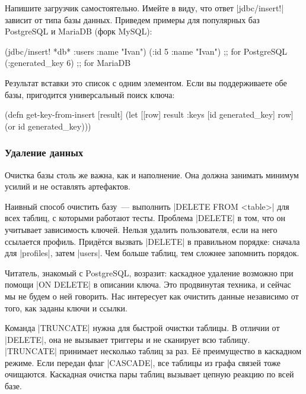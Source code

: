 
Напишите загрузчик самостоятельно. Имейте в виду, что ответ
\spverb|jdbc/insert!| зависит от типа базы данных. Приведем примеры для
популярных баз PostgreSQL и MariaDB (форк MySQL):

\begin{english}
  \begin{clojure}
(jdbc/insert! *db* :users {:name "Ivan"})
({:id 5 :name "Ivan"}) ;; for PostgreSQL
({:generated_key 6})  ;; for MariaDB
  \end{clojure}
\end{english}

Результат вставки это список с одним элементом. Если вы поддерживаете обе базы,
пригодится универсальный поиск ключа:

\begin{english}
  \begin{clojure}
(defn get-key-from-insert [result]
  (let [[row] result
        {:keys [id generated_key]} row]
    (or id generated_key)))
  \end{clojure}
\end{english}

\subsubsection*{Удаление данных}


Очистка базы столь же важна, как и наполнение. Она должна занимать минимум
усилий и не оставлять артефактов.

Наивный способ очистить базу~--- выполнить \spverb|DELETE FROM <table>| для всех
таблиц, с которыми работают тесты. Проблема \spverb|DELETE| в том, что он
учитывает зависимость ключей. Нельзя удалить пользователя, если на него
ссылается профиль. Придётся вызвать \spverb|DELETE| в правильном порядке:
сначала для \spverb|profiles|, затем \spverb|users|. Чем больше таблиц, тем
сложнее запомнить порядок.


Читатель, знакомый с PostgreSQL, возразит: каскадное удаление возможно при
помощи \spverb|ON DELETE| в описании ключа. Это продвинутая техника, и сейчас
мы не будем о ней говорить. Нас интересует как очистить данные независимо от
того, как заданы ключи и ссылки.


Команда \spverb|TRUNCATE|  нужна для быстрой очистки таблицы. В
отличии от \spverb|DELETE|, она не вызывает триггеры и не сканирует всю
таблицу. \spverb|TRUNCATE| принимает несколько таблиц за раз. Её
преимущество в каскадном режиме. Если передан флаг \spverb|CASCADE|, все таблицы
из графа связей тоже очищаются. Каскадная очистка пары таблиц вызывает цепную
реакцию по всей базе.

